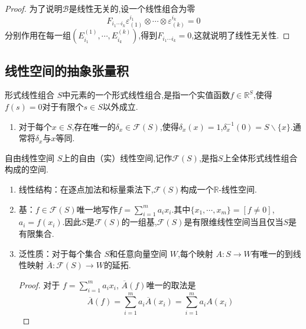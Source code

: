 \documentclass[../../几何与拓扑.tex]{subfiles}
\begin{document}
\begin{proof}
       为了说明$\mathscr{B}$是线性无关的,设一个线性组合为零 $$ F_{i_{1}{\cdots}i_{k}}\varepsilon _{\left( 1 \right) }^{i_{1}}\otimes {\cdots}\otimes  \varepsilon _{\left( k \right) }^{i_{k}}=0 $$分别作用在每一组$\left( E_{i_{1}}^{\left( 1 \right)},{\cdots},E_{i_{k}}^{\left( k \right)} \right)$,得到$F_{i_{1}{\cdots}i_{k}}=0$,这就说明了线性无关性.
\end{proof}

\subsection{线性空间的抽象张量积}

\begin{definition}{形式线性组合}
    $S$中元素的一个形式线性组合,是指一个实值函数$f \in \mathbb{R}^{S}$,使得$f\left( s \right)=0$对于有限个$s \in S$以外成立.
\end{definition}
\begin{remark}
    \begin{enumerate}
        \item 对于每个$x \in S$,存在唯一的$\delta _{x}\in \mathscr{F}\left( S \right)$,使得$\delta _{x}\left( x \right)=1$,$\delta _{x}^{-1}\left( 0 \right)= S\backslash\{ x \}$.通常将$\delta _{x}$与$x$等同.
    \end{enumerate}
    
\end{remark}

\begin{definition}{自由线性空间}
    $S$上的自由（实）线性空间,记作$\mathscr{F}\left( S \right)$,是指$S$上全体形式线性组合构成的空间.
\end{definition}

\begin{remark}
    \begin{enumerate}
        \item 线性结构：在逐点加法和标量乘法下,$\mathscr{F}\left( S \right)$构成一个$\mathbb{R}$-线性空间.
        \item 基：$f \in \mathscr{F}\left( S \right)$唯一地写作$f=\sum _{i=1}^{m}a_{i}x_{i}$.其中$\{ x_{1},{\cdots},x_{m} \}=[f\neq 0]$,$a_{i}=f\left( x_{i} \right)$.因此$S$是$\mathscr{F}\left( S \right)$的一组基,$\mathscr{F}\left( S \right)$是有限维线性空间当且仅当$S$是有限集合.
        \item 泛性质：对于每个集合 $ S $和任意向量空间 $ W $,每个映射 $ A:S\to W $有唯一的到线性映射 $ \overline{A}: \mathscr{F}\left( S \right) \to W $的延拓.  
        \begin{proof}
            对于 $ f= \sum_{i=1 }^{m} a_{i}x_{i} $, $ \overline{A} \left( f \right) $唯一的取法是 $$
            \overline{A}\left( f \right)  =\sum_{i=1}^{m} a_{i} \overline{A} \left( x_{i}    \right)=  \sum_{i=1}^{m} a_{i}A\left( x_{i} \right) 
            $$ 
        \end{proof}
    \end{enumerate}
    
\end{remark}
\end{document}
